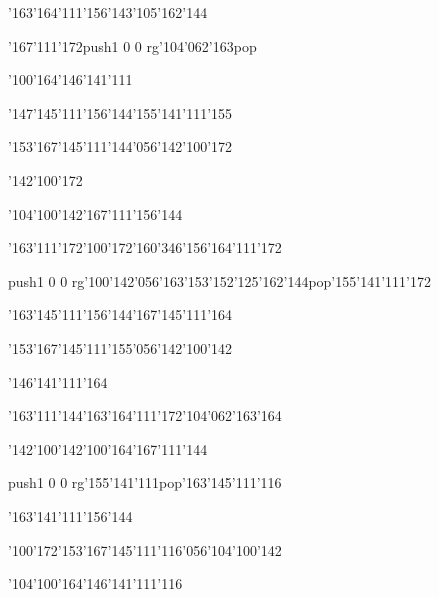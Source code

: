\null\vfill\ipa\centerline{\enskip\enskip\enskip\enskip\enskip\char'163\char'164\char'111\char'156\enskip\enskip\enskip\enskip\enskip\char'143\char'105\char'162\char'144}\medskip\centerline{\enskip\char'167\char'111\char'172\enskip\enskip\enskip\enskip\enskip\enskip\enskip\enskip\pdfcolorstack\match push{1 0 0 rg}\char'104\char'062\char'163\pdfcolorstack\match pop{}}\medskip\centerline{\enskip\char'100\char'164\enskip\enskip\enskip\enskip\enskip\enskip\enskip\enskip\char'146\char'141\char'111\enskip\enskip\enskip\enskip\enskip}\medskip\centerline{\enskip\enskip\enskip\enskip\char'147\char'145\char'111\char'156\char'144\enskip\enskip\enskip\enskip\enskip\char'155\char'141\char'111\char'155}\medskip\centerline{\enskip\enskip\enskip\enskip\enskip\enskip\enskip\char'153\char'167\char'145\char'111\char'144\char'056\char'142\char'100\char'172}\medskip\centerline{\enskip\char'142\char'100\char'172\enskip\enskip\enskip\enskip\enskip\enskip\enskip\enskip}\medskip\vfill\footline{\hfil\tt\folio\hfil}\eject
\null\vfill\ipa\centerline{\enskip\char'104\char'100\char'142\enskip\enskip\enskip\enskip\enskip\enskip\enskip\enskip\enskip\char'167\char'111\char'156\char'144}\medskip\centerline{\enskip\char'163\char'111\char'172\enskip\char'100\char'172\enskip\char'160\char'346\char'156\enskip\char'164\char'111\char'172}\medskip\centerline{\enskip\pdfcolorstack\match push{1 0 0 rg}\char'100\char'142\char'056\char'163\char'153\char'152\char'125\char'162\char'144\pdfcolorstack\match pop{}\enskip\enskip\enskip\enskip\enskip\char'155\char'141\char'111\char'172}\medskip\centerline{\enskip\enskip\enskip\enskip\char'163\char'145\char'111\char'156\char'144\enskip\enskip\enskip\enskip\enskip\char'167\char'145\char'111\char'164}\medskip\centerline{\enskip\enskip\enskip\enskip\enskip\enskip\enskip\char'153\char'167\char'145\char'111\char'155\char'056\char'142\char'100\char'142}\medskip\centerline{\enskip\enskip\enskip\enskip\enskip\enskip\enskip\enskip\char'146\char'141\char'111\char'164}\medskip\vfill\footline{\hfil\tt\folio\hfil}\eject
\null\vfill\ipa\centerline{\enskip\char'163\char'111\char'144\enskip\char'163\char'164\char'111\char'172\enskip\enskip\enskip\enskip\enskip\char'104\char'062\char'163\char'164}\medskip\centerline{\enskip\char'142\char'100\char'142\enskip\char'100\char'164\enskip\enskip\enskip\enskip\enskip\char'167\char'111\char'144}\medskip\centerline{\enskip\enskip\enskip\enskip\enskip\enskip\enskip\enskip\enskip\enskip\pdfcolorstack\match push{1 0 0 rg}\char'155\char'141\char'111\pdfcolorstack\match pop{}\enskip\char'163\char'145\char'111\char'116}\medskip\centerline{\enskip\enskip\enskip\enskip\char'163\char'141\char'111\char'156\char'144\enskip\enskip\enskip\enskip\enskip\enskip\enskip\enskip\enskip}\medskip\centerline{\enskip\char'100\char'172\enskip\enskip\enskip\enskip\char'153\char'167\char'145\char'111\char'116\char'056\char'104\char'100\char'142}\medskip\centerline{\enskip\char'104\char'100\char'164\enskip\enskip\enskip\enskip\char'146\char'141\char'111\char'116}\medskip\vfill\footline{\hfil\tt\folio\hfil}\eject
